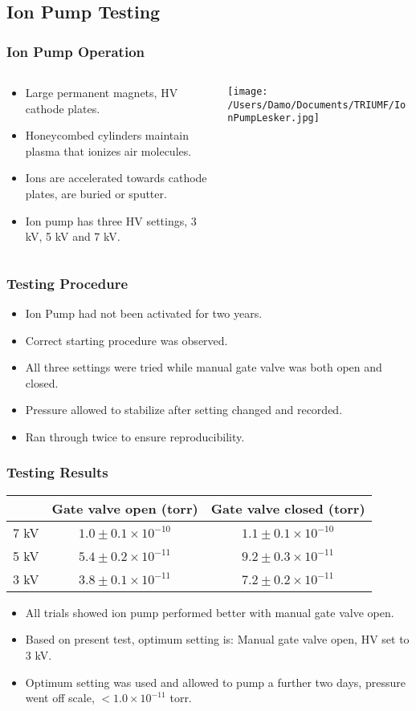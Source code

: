 \documentclass{beamer}
\begin{document}
\subsection{Ion Pump Testing}
\frame
{
  \frametitle{Ion Pump Operation}
  \begin{columns}[T]
    \begin{column}{0.50\textwidth}
      \begin{itemize}
        \item<1>Large permanent magnets, HV cathode plates.
        \item<1>Honeycombed cylinders maintain plasma that ionizes air molecules.
        \item<1>Ions are accelerated towards cathode plates, are buried or sputter.
        \item<1>Ion pump has three HV settings, 3 kV, 5 kV and 7 kV.
      \end{itemize}
    \end{column}
    \begin{column}{0.50\textwidth}
    \texttt{[image: /Users/Damo/Documents/TRIUMF/IonPumpLesker.jpg]}
    \end{column}
  \end{columns}
}
\frame
{
  \frametitle{Testing Procedure}
  \begin{itemize}
  \item<1>Ion Pump had not been activated for two years.
  \item<1>Correct starting procedure was observed.
  \item<1>All three settings were tried while manual gate valve was both open and closed.
  \item<1>Pressure allowed to stabilize after setting changed and recorded.
  \item<1>Ran through twice to ensure reproducibility.
  \end{itemize}
}
\frame
{
  \frametitle{Testing Results}
  \begin{table}[htdp]
\begin{center}
\begin{tabular}{|c|c|c|}
\hline
&Gate valve open (torr) &Gate valve closed (torr) \\
\hline
7 kV&$1.0\pm 0.1\times 10^{-10}$&$1.1\pm0.1\times 10^{-10}$\\
5 kV&$5.4\pm0.2\times 10^{-11}$&$9.2\pm0.3\times 10^{-11}$\\
3 kV&$3.8\pm0.1\times 10^{-11}$&$7.2\pm0.2\times 10^{-11}$\\
\hline
\end{tabular}
\end{center}
\label{Table 1}
\end{table}%
  \begin{itemize}
  \item<1> All trials showed ion pump performed better with manual gate valve open.
  \item<1> Based on present test, optimum setting is: Manual gate valve open, HV set to 3 kV.
  \item<1> Optimum setting was used and allowed to pump a further two days, pressure went off scale, $<1.0\times10^{-11}$ torr.
  \end{itemize}
}
\end{document}
